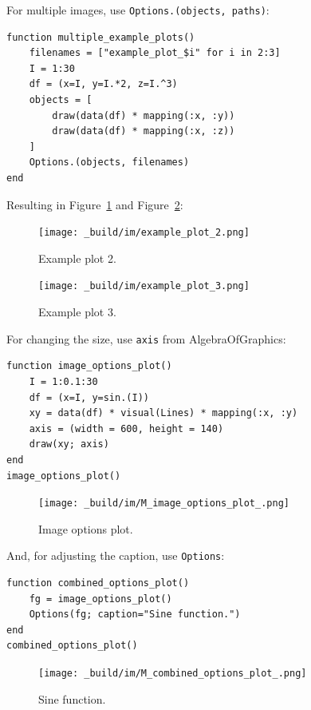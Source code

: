 \documentclass[
  14pt
  american,
  paper=a4,
  ,captions=tableheading
]{scrreprt}
\newcommand{\passthrough}[1]{#1}
\begin{document}
For multiple images, use
\passthrough{\lstinline!Options.(objects, paths)!}:

\begin{lstlisting}
function multiple_example_plots()
    filenames = ["example_plot_$i" for i in 2:3]
    I = 1:30
    df = (x=I, y=I.*2, z=I.^3)
    objects = [
        draw(data(df) * mapping(:x, :y))
        draw(data(df) * mapping(:x, :z))
    ]
    Options.(objects, filenames)
end
\end{lstlisting}

Resulting in Figure~\ref{fig:example_plot_2} and
Figure~\ref{fig:example_plot_3}:

\begin{figure}
\hypertarget{fig:example_plot_2}{%
\centering
\texttt{[image: \_build/im/example\_plot\_2.png]}
\caption{Example plot 2.}\label{fig:example_plot_2}
}
\end{figure}

\begin{figure}
\hypertarget{fig:example_plot_3}{%
\centering
\texttt{[image: \_build/im/example\_plot\_3.png]}
\caption{Example plot 3.}\label{fig:example_plot_3}
}
\end{figure}

For changing the size, use \passthrough{\lstinline!axis!} from
AlgebraOfGraphics:

\begin{lstlisting}
function image_options_plot()
    I = 1:0.1:30
    df = (x=I, y=sin.(I))
    xy = data(df) * visual(Lines) * mapping(:x, :y)
    axis = (width = 600, height = 140)
    draw(xy; axis)
end
image_options_plot()
\end{lstlisting}

\begin{figure}
\hypertarget{fig:image_options_plot}{%
\centering
\texttt{[image: \_build/im/M\_image\_options\_plot\_.png]}
\caption{Image options plot.}\label{fig:image_options_plot}
}
\end{figure}

And, for adjusting the caption, use \passthrough{\lstinline!Options!}:

\begin{lstlisting}
function combined_options_plot()
    fg = image_options_plot()
    Options(fg; caption="Sine function.")
end
combined_options_plot()
\end{lstlisting}

\begin{figure}
\centering
\texttt{[image: \_build/im/M\_combined\_options\_plot\_.png]}
\caption{Sine function.}
\end{figure}
\end{document}

